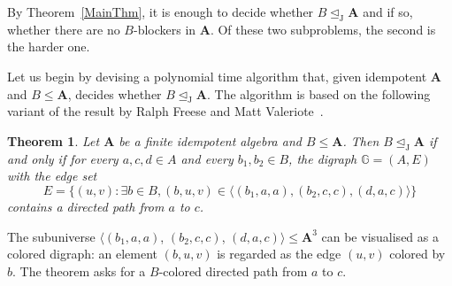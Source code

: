 \documentclass{amsart}
\theoremstyle{plain}
\newtheorem{theorem}{Theorem}
\theoremstyle{definition}
\begin{document}
By Theorem~\ref{MainThm}, it is enough to decide whether $B\operatorname{\trianglelefteq_J}{{\mathbf{A}}}$
and if so, whether there are no $B$-blockers in ${{\mathbf{A}}}$. Of these two
subproblems, the second is the harder one.

Let us begin by devising  a polynomial time algorithm that, given idempotent
${{\mathbf{A}}}$ and $B\leq {{\mathbf{A}}}$, decides whether $B\operatorname{\trianglelefteq_J} {{\mathbf{A}}}$.  The algorithm is based on the following variant of the result by Ralph Freese and Matt Valeriote~\cite[Proposition~5.7]{matt-complexity-maltsev-conditions}.  

\begin{theorem}\label{thmJPath}
  Let ${{\mathbf{A}}}$ be a finite idempotent algebra and $B\leq {{\mathbf{A}}}$. Then $B\operatorname{\trianglelefteq_J}
  {{\mathbf{A}}}$ if and only if 
  for every $a,c,d\in A$ and every $b_1,b_2\in B$, the digraph ${\mathbb{{G}}}=(A,E)$ with the
  edge set
  \[
    E=\{(u,v)\colon \exists b\in B, (b,u,v)\in \langle(b_1,a,a), (b_2,c,c),
    (d,a,c)\rangle\}
  \]
contains a directed path from $a$ to $c$.
\end{theorem} 

The subuniverse $\langle(b_1,a,a)$, $(b_2,c,c)$, $(d,a,c)\rangle \leq {{\mathbf{A}}}^3$ 
can be visualised as a colored digraph: an element $(b,u,v)$ is regarded as the edge $(u,v)$ colored by $b$. 
The theorem asks for a $B$-colored directed path from $a$ to $c$.
\end{document}
